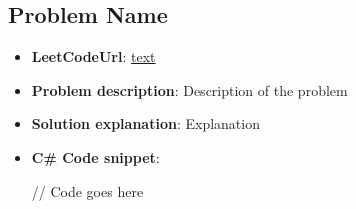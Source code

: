 \subsection{Problem Name}

\begin{itemize}
    \item \textbf{LeetCodeUrl}: \href{url}{text}
    \item \textbf{Problem description}: Description of the problem
    \item \textbf{Solution explanation}: Explanation
    \item \textbf{C\# Code snippet}:
    \begin{spverbatim}
        // Code goes here
    \end{spverbatim}
\end{itemize}